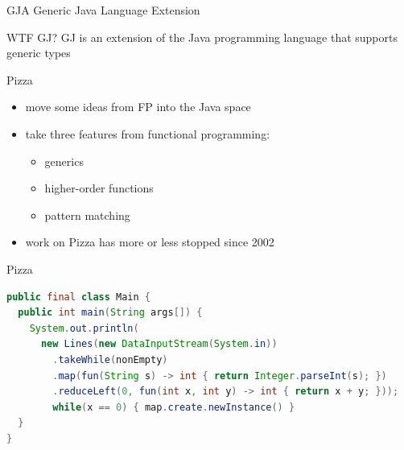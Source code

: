\documentclass[aspectratio=169]{beamer}
\begin{document}
\begin{frame}[fragile]{GJ}{A Generic Java Language Extension}
  \begin{block}{WTF GJ?}
    GJ is an extension of the Java programming language that supports generic types
  \end{block}
\end{frame}

\begin{frame}{Pizza}
  \begin{itemize}
    \item move some ideas from FP into the Java space
    \item take three features from functional programming:
      \begin{itemize}
        \item generics
        \item higher-order functions
        \item pattern matching
      \end{itemize}
    \item work on Pizza has more or less stopped since 2002 \large\Cross
  \end{itemize}
\end{frame}

\begin{frame}[fragile]{Pizza}
  \begin{lstlisting}[style=scala,language=java]
public final class Main {
  public int main(String args[]) {
    System.out.println(
      new Lines(new DataInputStream(System.in))
        .takeWhile(nonEmpty)
        .map(fun(String s) -> int { return Integer.parseInt(s); })
        .reduceLeft(0, fun(int x, int y) -> int { return x + y; }));
        while(x == 0) { map.create.newInstance() }
  }
}
  \end{lstlisting}
\end{frame}
\end{document}
